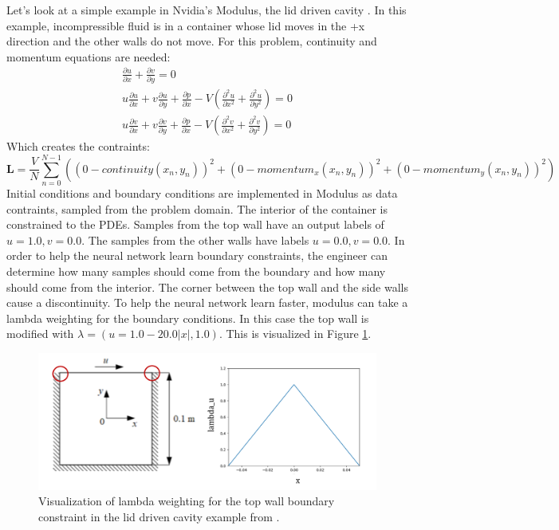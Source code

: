 \documentclass[]{article}
\begin{document}
Let's look at a simple example in Nvidia's Modulus, the lid driven cavity \cite{nvidia_modulus}.  In this example, incompressible fluid is in a container whose lid moves in the +x direction and the other walls do not move.  For this problem, continuity and momentum equations are needed:
\begin{gather}
\frac{\partial u}{\partial x} + \frac{\partial v}{\partial y} = 0 \\
u\frac{\partial u}{\partial x} + v\frac{\partial u}{\partial y} + \frac{\partial p}{\partial x} - \textit{V}(\frac{\partial^2u}{\partial x^2} + \frac{\partial^2u}{\partial y^2})= 0 \\
u\frac{\partial v}{\partial x} + v\frac{\partial v}{\partial y} + \frac{\partial p}{\partial x} - \textit{V}(\frac{\partial^2v}{\partial x^2} + \frac{\partial^2v}{\partial y^2})= 0
\end{gather}
Which creates the contraints:
\begin{equation}
\textbf{L} = \frac{V}{N}\sum_{n = 0}^{N - 1}((0 - continuity(x_n, y_n))^2 + (0 - momentum_x(x_n, y_n))^2 + (0 - momentum_y(x_n, y_n))^2) 
\end{equation}
Initial conditions and boundary conditions are implemented in Modulus as data contraints, sampled from the problem domain.  The interior of the container is constrained to the PDEs.  Samples from the top wall have an output labels of $u=1.0, v = 0.0$.  The samples from the other walls have labels $u=0.0, v = 0.0$.  In order to help the neural network learn boundary constraints, the engineer can determine how many samples should come from the boundary and how many should come from the interior.  The corner between the top wall and the side walls cause a discontinuity.  To help the neural network learn faster, modulus can take a lambda weighting for the boundary conditions.  In this case the top wall is modified with $\lambda = (u = 1.0 - 20.0|x|, 1.0)$.  This is visualized in Figure \ref{fig:ldclambda}.
\begin{figure}
	\centering
	\includegraphics[width=1\linewidth]{images/ldc_lambda}
	\caption[ldc_weighting]{Visualization of lambda weighting for the top wall boundary constraint in the lid driven cavity example from \cite{nvidia_modulus}.}
	\label{fig:ldclambda}
\end{figure}
\end{document}
